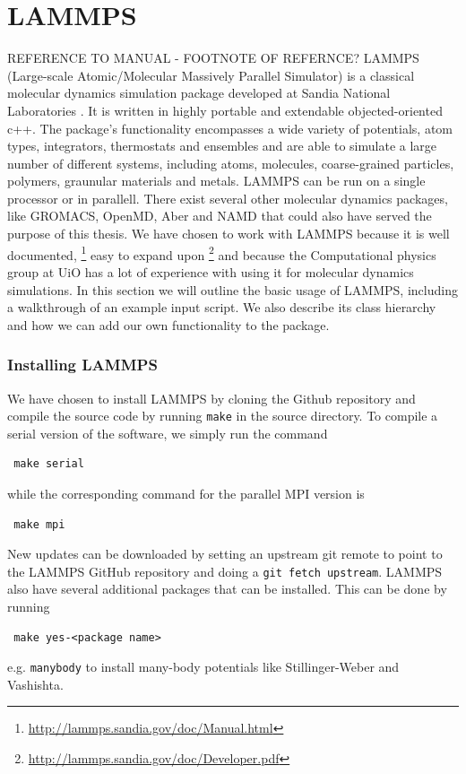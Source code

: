 \documentclass[twoside,english]{uiofysmaster}
\begin{document}
\chapter{LAMMPS}
REFERENCE TO MANUAL - FOOTNOTE OF REFERNCE?
LAMMPS (Large-scale Atomic/Molecular Massively Parallel Simulator)
is a classical molecular dynamics simulation package 
developed at Sandia National Laboratories \cite{Plimpton95}. It is written
in highly portable and extendable objected-oriented c++. 
The package's functionality encompasses a wide variety of 
potentials, atom types, integrators, thermostats and 
ensembles and are able to simulate a large number
of different systems, including atoms, molecules, 
coarse-grained particles, polymers, graunular materials
and metals. LAMMPS can be run on a single processor
or in parallell. 
There exist several other molecular dynamics packages, 
like GROMACS, OpenMD, Aber and NAMD that could also
have served the purpose of this thesis. We have chosen
to work with LAMMPS because it is well documented, 
\footnote{\href{http://lammps.sandia.gov/doc/Manual.html}{http://lammps.sandia.gov/doc/Manual.html}}
easy to expand upon \footnote{\href{http://lammps.sandia.gov/doc/Developer.pdf}{http://lammps.sandia.gov/doc/Developer.pdf}}
and because the Computational
physics group at UiO has a lot of experience with using
it for molecular dynamics simulations. 
In this section we will outline the basic usage of LAMMPS, including
a walkthrough of an example input script. We also describe its
class hierarchy and how we can add our own functionality
to the package.

\subsection{Installing LAMMPS}
We have chosen to install LAMMPS by cloning
the Github repository and compile the source
code by running \texttt{make} in the source directory. 
To compile a serial version of the software, we simply run
the command
\begin{lstlisting}
 make serial
\end{lstlisting}
while the corresponding command for the parallel
MPI version is
\begin{lstlisting}
 make mpi
\end{lstlisting}
New updates can be downloaded by setting an
upstream git remote to point to the LAMMPS
GitHub repository and doing a \texttt{git fetch upstream}. 
LAMMPS also have several additional packages that
can be installed. This can be done by running
\begin{lstlisting}
 make yes-<package name>
\end{lstlisting}
e.g. \texttt{manybody} to install many-body potentials
like Stillinger-Weber and Vashishta. 
\end{document}
